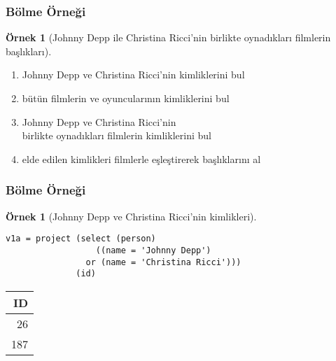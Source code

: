 \documentclass[dvipsnames]{beamer}
\theoremstyle{definition}
\theoremstyle{example}
\newtheorem{ornek}[theorem]{Örnek}
\theoremstyle{plain}
\begin{document}
\begin{frame}
  \frametitle{Bölme Örneği}

  \begin{ornek}[Johnny Depp ile Christina Ricci'nin birlikte oynadıkları
                filmlerin başlıkları]
    \pause
    \begin{enumerate}
      \item Johnny Depp ve Christina Ricci'nin kimliklerini bul

      \pause
      \item bütün filmlerin ve oyuncularının kimliklerini bul

      \pause
      \item Johnny Depp ve Christina Ricci'nin\\
	birlikte oynadıkları filmlerin kimliklerini bul

      \pause
      \item elde edilen kimlikleri filmlerle eşleştirerek başlıklarını al
    \end{enumerate}
  \end{ornek}
\end{frame}

\begin{frame}[fragile]
  \frametitle{Bölme Örneği}

  \begin{ornek}[Johnny Depp ve Christina Ricci'nin kimlikleri]
    \begin{lstlisting}
v1a = project (select (person)
                  ((name = 'Johnny Depp')
                or (name = 'Christina Ricci')))
              (id)
    \end{lstlisting}

    \pause
    \begin{tiny}
    \begin{table}
      \begin{tabular}{|r|}\hline
 ID\\\hline\hline
 26\\\hline
187\\\hline
      \end{tabular}
    \end{table}
    \end{tiny}
  \end{ornek}
\end{frame}
\end{document}
